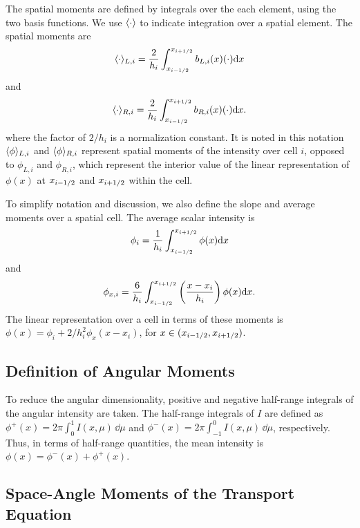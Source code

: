 The spatial moments are defined by integrals over the each element, using the two
basis functions.  We use $\langle \cdot \rangle$ to indicate integration over a
spatial element.  The spatial moments are
\begin{equation}\label{eq:x_moml}
\langle \cdot \rangle_{L,i} = \frac{2}{h_i} \int_{x_{i-1/2}}^{{x_{i+1/2}}} b_{L,i}(x) (\cdot) \mathrm{d} x
\end{equation}
and
\begin{equation}\label{eq:x_momr}
\langle \cdot \rangle_{R,i} = \frac{2}{h_i} \int_{x_{i-1/2}}^{{x_{i+1/2}}} b_{R,i}(x) (\cdot) \mathrm{d} x.
\end{equation}
where the factor of $2/h_i$ is a normalization constant.
It is noted in this notation $\langle \phi \rangle_{L,i}$ and
$\langle \phi \rangle_{R,i}$ represent spatial moments of the intensity over cell $i$, opposed
to $\phi_{L,i}$ and $\phi_{R,i}$, which represent the interior value of the linear
representation of $\phi(x)$ at $x_{{i-1/2}}$ and $x_{{i+1/2}}$ within the cell. 

To simplify notation and discussion, we also define the slope and average moments over a
spatial cell.  The average scalar intensity is
\begin{equation}
    \phi_i = \frac{1}{h_i} \int_{{x_{i-1/2}}}^{{x_{i+1/2}}} \phi(x) \mathrm{d} x
\end{equation}
and
\begin{equation}
    \phi_{x,i} = \frac{6}{h_i} \int_{{x_{i-1/2}}}^{{x_{i+1/2}}} \left(\frac{x-x_i}{h_i} \right)
    \phi(x) \mathrm{d} x . 
\end{equation}
The linear representation over a cell in terms of these moments is $\phi(x) = \phi_i
+ 2/h_{i}^2 \phi_x (x - x_i)$, for $x\in({x_{i-1/2}},{x_{i+1/2}})$. 

\subsection{Definition of Angular Moments}

To reduce the angular dimensionality, positive and
negative half-range integrals of the angular intensity are taken.  The half-range
integrals of $I$ are defined as $ \phi^+(x) = 2 \pi \int_0^{1} I(x,\mu)\, \dd \mu$ and $
\phi^-(x) = 2 \pi \int_{-1}^{0} I(x,\mu) \,\dd
\mu$, respectively.  Thus, in terms of half-range quantities, the mean intensity is $\phi(x) = \phi^-(x) +
\phi ^+(x)$.

\subsection{Space-Angle Moments of the Transport Equation}

